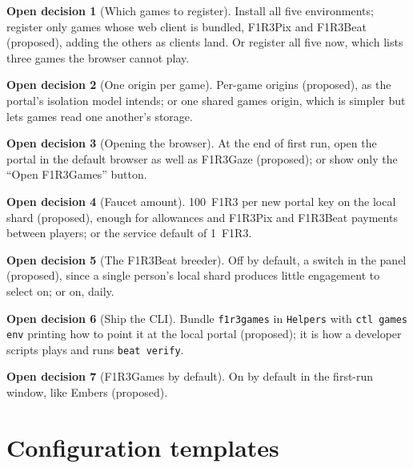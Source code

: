 \documentclass[11pt]{article}
\theoremstyle{definition}
\newtheorem{decision}{Open decision}
\theoremstyle{remark}
\newcommand{\code}[1]{\texttt{#1}}
\newcommand{\Gz}{F1R3Gaze}
\newcommand{\Gm}{F1R3Games}
\newcommand{\Em}{Embers}
\begin{document}
\begin{decision}[Which games to register]\label{dec:which}
Install all five environments; register only games whose web client is bundled,
F1R3Pix and F1R3Beat (proposed), adding the others as clients land. Or register all
five now, which lists three games the browser cannot play.
\end{decision}

\begin{decision}[One origin per game]\label{dec:pergame}
Per-game origins (proposed), as the portal's isolation model intends; or one shared
games origin, which is simpler but lets games read one another's storage.
\end{decision}

\begin{decision}[Opening the browser]\label{dec:open}
At the end of first run, open the portal in the default browser as well as \Gz{}
(proposed); or show only the ``Open \Gm{}'' button.
\end{decision}

\begin{decision}[Faucet amount]\label{dec:faucet}
100~F1R3 per new portal key on the local shard (proposed), enough for allowances and
F1R3Pix and F1R3Beat payments between players; or the service default of 1~F1R3.
\end{decision}

\begin{decision}[The F1R3Beat breeder]\label{dec:breeder}
Off by default, a switch in the panel (proposed), since a single person's local shard
produces little engagement to select on; or on, daily.
\end{decision}

\begin{decision}[Ship the CLI]\label{dec:cli}
Bundle \code{f1r3games} in \code{Helpers} with \code{ctl games env} printing how to
point it at the local portal (proposed); it is how a developer scripts plays and runs
\code{beat verify}.
\end{decision}

\begin{decision}[\Gm{} by default]\label{dec:default}
On by default in the first-run window, like \Em{} (proposed).
\end{decision}

\appendix
\section{Configuration templates}\label{app:conf}
\end{document}
